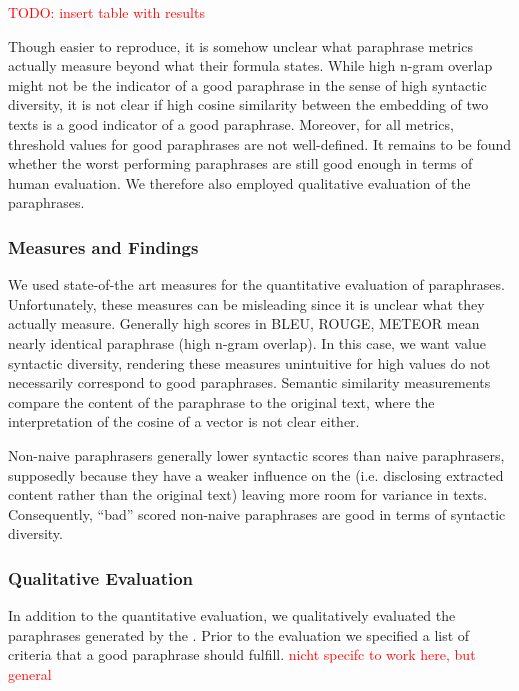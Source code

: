 \textcolor{red}{TODO: insert table with results}

Though easier to reproduce, it is somehow unclear what paraphrase metrics actually measure beyond what their formula states.
While high n-gram overlap might not be the indicator of a good paraphrase in the sense of high syntactic diversity, 
it is not clear if high cosine similarity between the embedding of two texts is a good indicator of a good paraphrase.
Moreover, for all metrics, threshold values for good paraphrases are not well-defined.
It remains to be found whether the worst performing paraphrases are still good enough in terms of human evaluation.
We therefore also employed qualitative evaluation of the paraphrases.

\subsubsection{Measures and Findings}
\label{subsec:measures_and_findings}

We used state-of-the art measures for the quantitative evaluation of paraphrases. 
Unfortunately, these measures can be misleading since it is unclear what they actually measure.
Generally high scores in BLEU, ROUGE, METEOR mean nearly identical paraphrase (high n-gram overlap).
In this case, we want value syntactic diversity, rendering these measures unintuitive 
for high values do not necessarily correspond to good paraphrases.
Semantic similarity measurements compare the content of the paraphrase to the original text, 
where the interpretation of the cosine of a vector is not clear either.

Non-naive paraphrasers generally lower syntactic scores than naive paraphrasers,
supposedly because they have a weaker influence on the \pgenerator{} 
(i.e. disclosing extracted content rather than the original text)
leaving more room for variance in texts.
Consequently, \enquote{bad} scored non-naive paraphrases are good in terms of syntactic diversity.

\subsubsection{Qualitative Evaluation}
\label{subsec:qualitative_evaluation}

In addition to the quantitative evaluation, we qualitatively evaluated the paraphrases generated by the \pgenerator{}.
Prior to the evaluation we specified a list of criteria that a good paraphrase should fulfill.
\textcolor{red}{nicht specifc to work here, but general}
